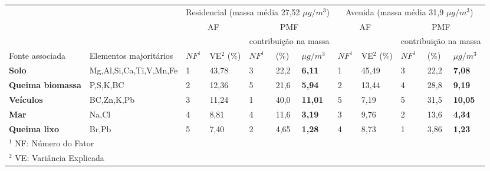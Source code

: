 \begin{tabular}{llll|lll|ll|lll}
\hline
                                                  &                        & \multicolumn{5}{c|}{Residencial (massa média 27,52 $\mu g / m^3$)} & \multicolumn{5}{c}{Avenida (massa média 31,9 $\mu g / m^3$)}    \\
                                                  &                        & \multicolumn{2}{c}{AF}      & \multicolumn{3}{c|}{PMF}              & \multicolumn{2}{c}{AF}                      & \multicolumn{3}{c}{PMF}          \\
\hline
 & & & & \multicolumn{3}{c|}{contribuição na massa} & & & \multicolumn{3}{c}{contribuição na massa} \\
Fonte associada                                   & Elementos majoritários & $NF^1$   & VE$^2$ (\%)               & $NF^1$   & (\%)   & $\mu g / m^3$  & $NF^1$       & VE$^2$  (\%)            & $NF^1$ & (\%)  & $\mu g / m^3$ \\
\hline
\textbf{Solo}                                     & Mg,Al,Si,Ca,Ti,V,Mn,Fe & 1   & 43,78                 & 3   & 22,2         & \textbf{6,11}   & 1       & 45,49               & 3 & 22,2        & \textbf{7,08}  \\
\textbf{Queima biomassa}                          & P,S,K,BC                  & 2   & 12,36                 & 5   & 21,6         & \textbf{5,94}   & 2       & 13,44               & 4 & 28,8        & \textbf{9,19}  \\
\textbf{Veículos}                                 & BC,Zn,K,Pb             & 3   & 11,24                 & 1   & 40,0           & \textbf{11,01}  & 5       & 7,19                & 5 & 31,5        & \textbf{10,05} \\
\textbf{Mar}                                      & Na,Cl                  & 4   & 8,81                  & 4   & 11,6         & \textbf{3,19}   & 3       & 9,76                & 2 & 13,6        & \textbf{4,34}  \\
\textbf{Queima lixo} & Br,Pb                      & 5   & 7,40                   & 2   & 4,65         & \textbf{1,28}   & 4       & 8,73                & 1 & 3,86        & \textbf{1,23} \\

\hline
\multicolumn{12}{l}{$^1$ NF: Número do Fator} \\
\multicolumn{12}{l}{$^2$ VE: Variância Explicada} \\
\hline
\end{tabular}

